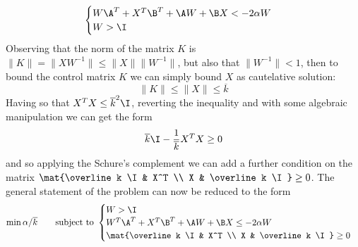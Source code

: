 	\[ \begin{cases}
		W\A^T + X^T\B ^T + \A W + \B X < -2\alpha W \\ W > \I
	\end{cases} \]
	Observing that the norm of the matrix $K$ is $\|K\| = \|X W^{-1}\| \leq \|X\| \|W^{-1}\|$, but also that $\|W^{-1}\| < 1$, then to bound the control matrix $K$ we can simply bound $X$ as cautelative solution:
	\[ \|K\| \leq  \| X\| \leq \overline k \]
	Having so that $X^T X \leq \overline k^2 \I$, reverting the inequality and with some algebraic manipulation we can get the form
	\[ \overline k \I - \frac 1{\overline k} X^T X \geq 0 \]
	and so applying the Schure's complement we can add a further condition on the matrix $\mat{\overline k \I & X^T \\ X & \overline k \I} \geq 0$. The general statement of the problem can now be reduced to the form
	\begin{equation} \min \alpha / \overline k \qquad \textrm{subject to }
		\begin{cases}
			W > \I \\
			W^T\A^T + X^T\B^T + \A W + \B X \leq -2\alpha W \\
			\mat{\overline k \I & X^T \\ X & \overline k \I} \geq 0
		\end{cases}
	\end{equation}
	

